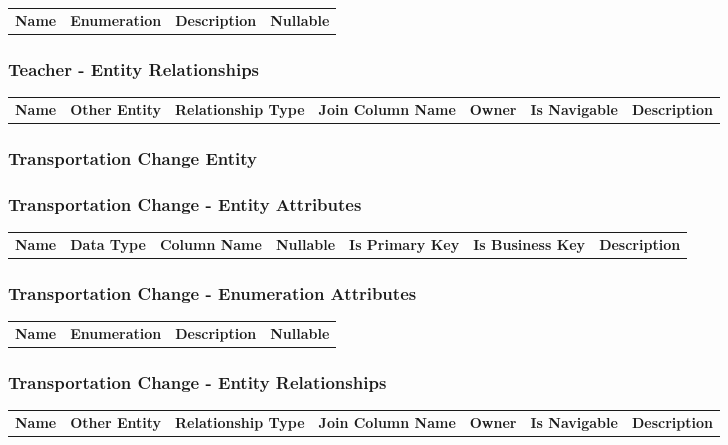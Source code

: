 \begin{tabular}{lcp{6.0cm}c}
\bfseries Name & \bfseries Enumeration & \bfseries Description & \bfseries Nullable \\
\end{tabular}

\subsubsection*{ Teacher - Entity Relationships}

\begin{tabular}{llllllp{2.0cm}}
\bfseries Name & \bfseries Other Entity & \bfseries Relationship Type & \bfseries Join Column Name & \bfseries Owner & \bfseries Is Navigable & \bfseries Description\\
\end{tabular}


\subsubsection{ Transportation Change Entity }

\subsubsection*{ Transportation Change - Entity Attributes }

\begin{tabular}{lllcccl}
\bfseries Name & \bfseries Data Type & \bfseries Column Name & \bfseries Nullable & \bfseries Is Primary Key & \bfseries Is Business Key & \bfseries Description\\
\end{tabular}

\subsubsection*{ Transportation Change - Enumeration Attributes}

\begin{tabular}{lcp{6.0cm}c}
\bfseries Name & \bfseries Enumeration & \bfseries Description & \bfseries Nullable \\
\end{tabular}

\subsubsection*{ Transportation Change - Entity Relationships}

\begin{tabular}{llllllp{2.0cm}}
\bfseries Name & \bfseries Other Entity & \bfseries Relationship Type & \bfseries Join Column Name & \bfseries Owner & \bfseries Is Navigable & \bfseries Description\\
\end{tabular}


